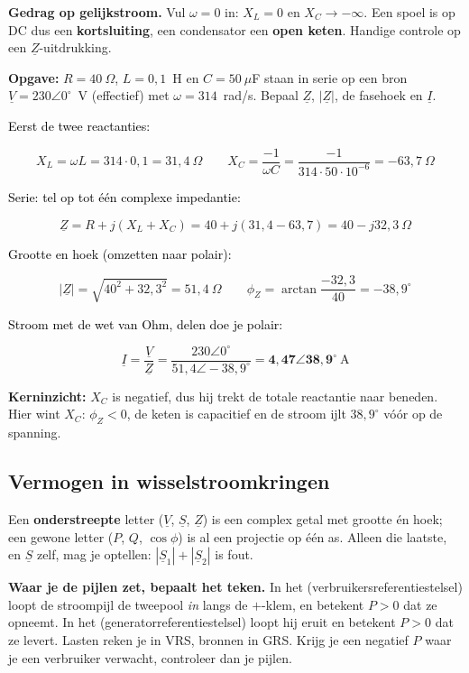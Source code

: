 \documentclass[a4paper,11pt]{article}
\newcommand{\stapreden}[1]{\par\vspace{1.4mm}\noindent\textcolor{black}{#1}\par\vspace{-2mm}}
\begin{document}
\textbf{Gedrag op gelijkstroom.} Vul $\omega = 0$ in: $X_L = 0$ en $X_C \rightarrow -\infty$. Een
spoel is op DC dus een \textbf{kortsluiting}, een condensator een \textbf{open keten}. Handige
controle op een $\underline{Z}$-uitdrukking.

\begin{oefening}
    \textbf{Opgave:} $R = 40\ \Omega$, $L = 0{,}1$~H en $C = 50\ \mu$F staan in serie op een bron
    $\underline{V} = 230\angle 0^\circ$~V (effectief) met $\omega = 314$~rad/s. Bepaal $\underline{Z}$,
    $|\underline{Z}|$, de fasehoek en $\underline{I}$.

    \stapreden{Eerst de twee reactanties:}
    \[X_L = \omega L = 314 \cdot 0{,}1 = 31{,}4\ \Omega \qquad
        X_C = \frac{-1}{\omega C} = \frac{-1}{314 \cdot 50\cdot10^{-6}} = -63{,}7\ \Omega\]

    \stapreden{Serie: tel op tot \'e\'en complexe impedantie:}
    \[\underline{Z} = R + j(X_L + X_C) = 40 + j(31{,}4 - 63{,}7) = 40 - j32{,}3\ \Omega\]

    \stapreden{Grootte en hoek (omzetten naar polair):}
    \[|\underline{Z}| = \sqrt{40^2 + 32{,}3^2} = 51{,}4\ \Omega \qquad
        \phi_Z = \arctan\frac{-32{,}3}{40} = -38{,}9^\circ\]

    \stapreden{Stroom met de wet van Ohm, delen doe je polair:}
    \[\underline{I} = \frac{\underline{V}}{\underline{Z}} = \frac{230\angle 0^\circ}{51{,}4\angle -38{,}9^\circ}
        = \mathbf{4{,}47\angle 38{,}9^\circ}\ \text{A}\]

    \textbf{Kerninzicht:} $X_C$ is negatief, dus hij trekt de totale reactantie naar beneden. Hier
    wint $X_C$: $\phi_Z < 0$, de keten is capacitief en de stroom ijlt $38{,}9^\circ$ v\'o\'or op de
    spanning.
\end{oefening}



\subsection{Vermogen in wisselstroomkringen}

Een \textbf{onderstreepte} letter ($\underline{V}$, $\underline{S}$, $\underline{Z}$) is een complex
getal met grootte \'en hoek; een gewone letter ($P$, $Q$, $\cos\phi$) is al een projectie op \'e\'en
as. Alleen die laatste, en $\underline{S}$ zelf, mag je optellen: $|\underline{S}_1|+|\underline{S}_2|$
is fout.

\textbf{Waar je de pijlen zet, bepaalt het teken.} In het 
(verbruikersreferentiestelsel) loopt de stroompijl de tweepool \emph{in} langs de $+$-klem, en
betekent $P>0$ dat ze opneemt. In het  (generatorreferentiestelsel) loopt hij eruit en
betekent $P>0$ dat ze levert. Lasten reken je in VRS, bronnen in GRS. Krijg je een negatief $P$ waar
je een verbruiker verwacht, controleer dan je pijlen.
\end{document}
